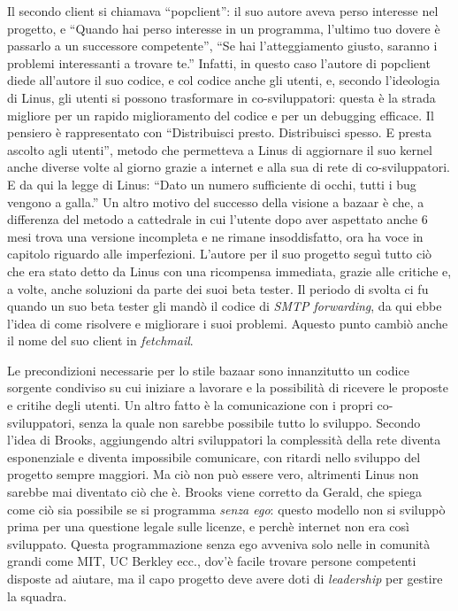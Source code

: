 \documentclass[a4page, 11pt, twocolumn]{article}
\begin{document}
Il secondo client si chiamava ``popclient'': il suo autore aveva perso interesse nel progetto, e ``Quando hai perso interesse in un programma, l'ultimo tuo dovere è passarlo a un successore competente'', ``Se hai l'atteggiamento giusto, saranno i problemi interessanti a trovare te.''
Infatti, in questo caso l'autore di popclient diede all'autore il suo codice, e col codice anche gli utenti, e, secondo l'ideologia di Linus, gli utenti si possono trasformare in co-sviluppatori: questa è la strada migliore per un rapido miglioramento del codice e per un debugging efficace.
Il pensiero è rappresentato con ``Distribuisci presto. Distribuisci spesso. E presta ascolto agli utenti'', metodo che permetteva a Linus di aggiornare il suo kernel anche diverse volte al giorno grazie a internet e alla sua di rete di co-sviluppatori.
E da qui la legge di Linus: ``Dato un numero sufficiente di occhi, tutti i bug vengono a galla.''
Un altro motivo del successo della visione a bazaar è che, a differenza del metodo a cattedrale in cui l'utente dopo aver aspettato anche 6 mesi trova una versione incompleta e ne rimane insoddisfatto, ora ha voce in capitolo riguardo alle imperfezioni.
L'autore per il suo progetto seguì tutto ciò che era stato detto da Linus con una ricompensa immediata, grazie alle critiche e, a volte, anche soluzioni da parte dei suoi beta tester.
Il periodo di svolta ci fu quando un suo beta tester gli mandò il codice di \textit{SMTP forwarding}, da qui ebbe l'idea di come risolvere e migliorare i suoi problemi.
Aquesto punto cambiò anche il nome del suo client in \textit{fetchmail}.

Le precondizioni necessarie per lo stile bazaar sono innanzitutto un codice sorgente condiviso su cui iniziare a lavorare e la possibilità di ricevere le proposte e critihe degli utenti.
Un altro fatto è la comunicazione con i propri co-sviluppatori, senza la quale non sarebbe possibile tutto lo sviluppo.
Secondo l'idea di Brooks, aggiungendo altri sviluppatori la complessità della rete diventa esponenziale e diventa impossibile comunicare, con ritardi nello sviluppo del progetto sempre maggiori.
Ma ciò non può essere vero, altrimenti Linus non sarebbe mai diventato ciò che è.
Brooks viene corretto da Gerald, che spiega come ciò sia possibile se si programma \textit{senza ego}: questo modello non si sviluppò prima per una questione legale sulle licenze, e perchè internet non era così sviluppato.
Questa programmazione senza ego avveniva solo nelle in comunità grandi come MIT, UC Berkley ecc., dov'è facile trovare persone competenti disposte ad aiutare, ma il capo progetto deve avere doti di \textit{leadership} per gestire la squadra.
\end{document}
